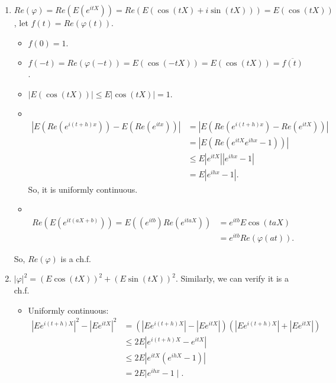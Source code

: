 \documentclass[11pt]{article}
\numberwithin{equation}{section}
\newenvironment{solution}{\begin{tcolorbox}[colback=white, colframe=black!50, breakable, title=Solution. ]\setlength{\parskip}{0.8em}}{\end{tcolorbox}}
\begin{document}
    \begin{solution}
        \begin{enumerate}
            \item $Re(\varphi)=Re(E(e^{itX}))=Re(E(\cos(tX)+i\sin(tX)))=E(\cos(tX))$, let $f(t)=Re(\varphi(t))$. 
            \begin{itemize}
                \item $f(0)=1$. 
                \item $f(-t)=Re(\varphi(-t))=E(\cos(-tX))=E(\cos(tX))=\overline{f(t)}$. 
                \item $|E(\cos(tX))|\leqslant E|\cos(tX)|=1.$ 
                \item \ \\
                \vspace{-30pt}\[
                    \begin{aligned}
                        \left|E(Re(e^{i(t+h) x}))-E(Re( e^{i t x})) \right| &=\left|E\left(Re( e^{i(t+h) x})-Re (e^{i t X})\right)\right| \\
                        &=\left|E( Re( e^{i t X}e^{i h x}-1))\right|\\
                        & \leqslant E\left|e^{i t X}\right|\left|e^{i h x}-1\right| \\
                        &=E\left|e^{i h x}-1\right| .
                        \end{aligned}
                \]
                So, it is uniformly continuous. 
                \item \ \\
                \vspace{-30pt}\[
                    \begin{aligned}
                        Re(E(e^{it(aX+b)}))=E ((e^{i t b}) Re (e^{i t a X})) &=e^{i t b} E \cos(t a X) \\
                        &=e^{i t b} Re( \varphi(a t)).
                        \end{aligned}
                \]
            \end{itemize}
            So, $Re(\varphi)$ is a ch.f. 
            \item $|\varphi|^2=\left(E\cos(tX)\right)^2+\left(E\sin(tX)\right)^2$. Similarly, we can verify it is a ch.f. 
            \begin{itemize}
                \item Uniformly continuous: \[
                    \begin{aligned}
                        \left|E e^{i(t+h) X}\right|^{2}-\left|E e^{itX}\right|^{2} &= \left(| E e^{i(t+h) X}|-| E e^{i t X} |\right)\left(|E e^{i(t+h) X}|+| E e^{i t X} |\right) \\ & \leqslant 2 E| e^{i(t+h) X}-e^{i t X} | \\ & \leqslant 2 E\left|e^{i t X}(e^{i h X}-1)\right|\\&=2 E| e^{i h x}-1 \mid .

\end{aligned}\]
\end{itemize}
\end{enumerate}
\end{solution}
\end{document}
